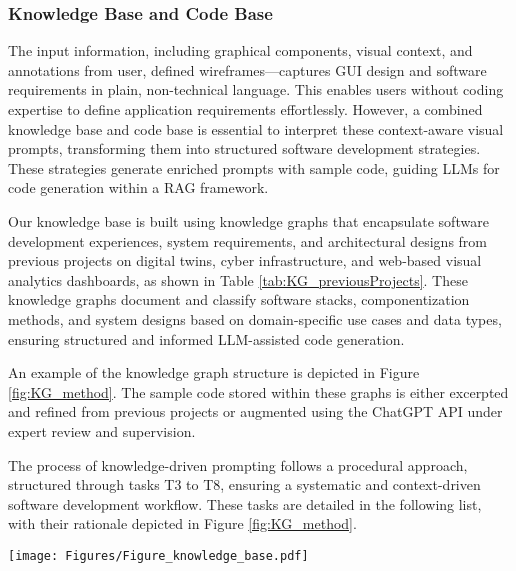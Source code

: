 \subsubsection{Knowledge Base and Code Base}
\label{subsec:KB_CB}
The input information, including graphical components, visual context, and annotations from user, defined wireframes—captures GUI design and software requirements in plain, non-technical language. This enables users without coding expertise to define application requirements effortlessly. However, a combined knowledge base and code base is essential to interpret these context-aware visual prompts, transforming them into structured software development strategies. These strategies generate enriched prompts with sample code, guiding LLMs for code generation within a RAG framework.

Our knowledge base is built using knowledge graphs that encapsulate software development experiences, system requirements, and architectural designs from previous projects on digital twins, cyber infrastructure, and web-based visual analytics dashboards, as shown in Table \ref{tab:KG_previousProjects}. These knowledge graphs document and classify software stacks, componentization methods, and system designs based on domain-specific use cases and data types, ensuring structured and informed LLM-assisted code generation.



An example of the knowledge graph structure is depicted in Figure \ref{fig:KG_method}. The sample code stored within these graphs is either excerpted and refined from previous projects or augmented using the ChatGPT API under expert review and supervision.

The process of knowledge-driven prompting follows a procedural approach, structured through tasks T3 to T8, ensuring a systematic and context-driven software development workflow. These tasks are detailed in the following list, with their rationale depicted in Figure \ref{fig:KG_method}.  

\begin{figure*}[htbp]
 \centering
\texttt{[image: Figures/Figure\_knowledge\_base.pdf]}
\caption{Structured knowledge representations for converting plain-language annotations from UI wireframes into structured prompts with technical terminology.}
 \label{fig:KG_method}
\end{figure*}

